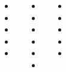 \documentclass[20pt, a1paper ]{tikzposter}
\begin{document}
\begin{columns}
{		}		






			{				
			\setlength{\leftmargini}{3em}			
			\setlength{\labelsep}{1em} %

			\begin{large}
			\begin{itemize}
			\item 

			\item 
			\item 
			\item 
			\item 
			\end{itemize}
			\end{large}
		}



			{				
			\setlength{\leftmargini}{3em}			
			\setlength{\labelsep}{1em} %

			\begin{large}
			\begin{itemize}
			\item 
			\item 
			\item 
			\item 
			\item 
			\item 
			\end{itemize}
			\end{large}
		}


			{				
			\setlength{\leftmargini}{3em}			
			\setlength{\labelsep}{1em} %

			\begin{large}
			\begin{itemize}
			\item 
			\item 
			\item 
			\item 
			\item 


\end{itemize}
\end{large}}
\end{columns}
\end{document}
